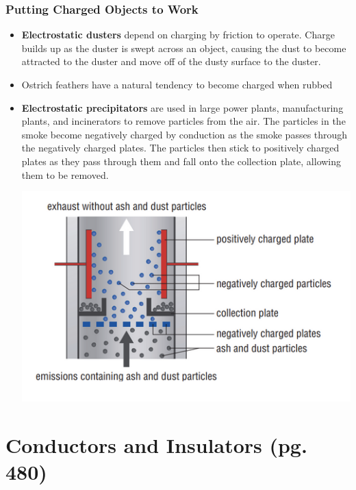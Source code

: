 \documentclass{article}
\begin{document}
    \subsubsection*{Putting Charged Objects to Work}
    \begin{itemize}
        \item \textbf{Electrostatic dusters} depend on charging by friction to operate. Charge builds up as the duster is swept across an object, causing the dust to become attracted to the duster and move off of the dusty surface to the duster.
        \item Ostrich feathers have a natural tendency to become charged when rubbed
        \item \textbf{Electrostatic precipitators} are used in large power plants, manufacturing plants, and incinerators to remove particles from the air. The particles in the smoke become negatively charged by conduction as the smoke passes through the negatively charged plates. The particles then stick to positively charged plates as they pass through them and fall onto the collection plate, allowing them to be removed.
        \begin{center}
            \includegraphics[scale = 0.7]{electrostatic precipitator}
        \end{center}

    \end{itemize}





\section{Conductors and Insulators (pg. 480)}
\end{document}
